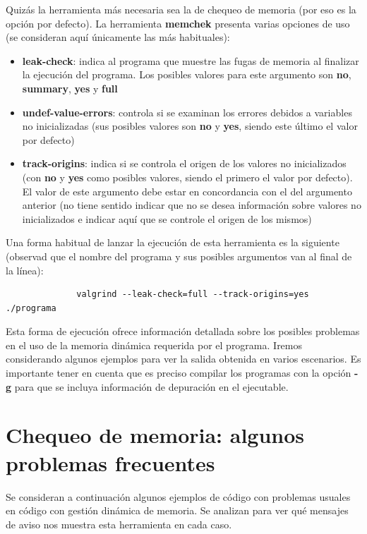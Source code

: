 \documentclass[11pt,a4paper,professionalfonts]{article}
\begin{document}
Quizás la herramienta más necesaria sea la de chequeo de memoria (por eso es
la opción por defecto). La herramienta \textbf{memchek} presenta varias
opciones de uso (se consideran aquí únicamente las más habituales):

\begin{itemize}
\item \textbf{leak-check}: indica al programa que muestre las fugas de memoria
al finalizar la ejecución del programa. Los posibles valores para este argumento
son \textbf{no}, \textbf{summary}, \textbf{yes} y \textbf{full}

\item \textbf{undef-value-errors}: controla si se examinan los errores debidos a
variables no inicializadas (sus posibles valores son \textbf{no} y \textbf{yes},
siendo este último el valor por defecto)

\item \textbf{track-origins}: indica si se controla el origen de los valores no
inicializados (con \textbf{no} y \textbf{yes} como posibles valores, siendo el
primero el valor por defecto). El valor de este argumento debe estar en concordancia
con el del argumento anterior (no tiene sentido indicar que no se desea información
sobre valores no inicializados e indicar aquí que se controle el origen de los
mismos)
\end{itemize}

Una forma habitual de lanzar la ejecución de esta herramienta es la siguiente 
(observad que el nombre del programa y sus posibles argumentos van al final
de la línea):

\begin{verbatim}
              valgrind --leak-check=full --track-origins=yes ./programa
\end{verbatim}

Esta forma de ejecución ofrece información detallada sobre los posibles
problemas en el uso de la memoria dinámica requerida por el programa. Iremos
considerando algunos ejemplos para ver la salida obtenida en varios escenarios. 
Es importante tener en cuenta que es preciso compilar los programas
con la opción \textbf{-g} para que se incluya información de depuración en
el ejecutable. 

\section{Chequeo de memoria: algunos problemas frecuentes}

Se consideran a continuación algunos ejemplos de código con problemas usuales
en código con gestión dinámica de memoria. Se analizan para ver qué mensajes
de aviso nos muestra esta herramienta en cada caso.
\end{document}

